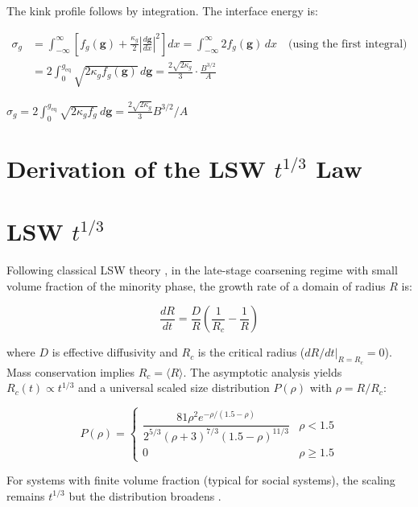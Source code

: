 \documentclass[12pt,a4paper]{article}
\theoremstyle{plain}
\theoremstyle{definition}
\newcommand{\gf}{\mathbf{g}}          %
\newcommand{\cn}[1]{\textcolor{scxgray}{\textit{#1}}}
\begin{document}
The kink profile follows by integration. The interface energy is:

\begin{align}
    \sigma_g &= \int_{-\infty}^{\infty} \left[f_g(\gf) +
        \frac{\kappa_g}{2}\left|\frac{d\gf}{dx}\right|^2\right] dx
    = \int_{-\infty}^{\infty} 2f_g(\gf)\,dx
    \quad\text{(using the first integral)} \\
    &= 2\int_0^{g_{\text{eq}}} \sqrt{2\kappa_g f_g(\gf)}\,d\gf
    = \frac{2\sqrt{2\kappa_g}}{3}\cdot\frac{B^{3/2}}{A}
\end{align}

\bigskip
\noindent
\cn{$\sigma_g = 2\int_0^{g_{\text{eq}}}\sqrt{2\kappa_g f_g}\,d\gf = \frac{2\sqrt{2\kappa_g}}{3}B^{3/2}/A$}

\section{Derivation of the LSW $t^{1/3}$ Law}
\section*{LSW $t^{1/3}$ }

Following classical LSW theory \cite{lifshitz1961, wagner1961}, in the
late-stage coarsening regime with small volume fraction of the minority
phase, the growth rate of a domain of radius $R$ is:

\begin{equation}
    \frac{dR}{dt} = \frac{D}{R}\left(\frac{1}{R_c} - \frac{1}{R}\right)
    \label{eq:lsw_growth_app}
\end{equation}

where $D$ is effective diffusivity and $R_c$ is the critical radius
($dR/dt|_{R=R_c}=0$). Mass conservation implies $R_c = \langle R\rangle$.
The asymptotic analysis \cite{lifshitz1961} yields $R_c(t) \propto t^{1/3}$
and a universal scaled size distribution $P(\rho)$ with $\rho = R/R_c$:

\begin{equation}
    P(\rho) = \begin{cases}
        \dfrac{81\rho^2 e^{-\rho/(1.5-\rho)}}{2^{5/3}(\rho+3)^{7/3}(1.5-\rho)^{11/3}} & \rho < 1.5 \\
        0 & \rho \ge 1.5
    \end{cases}
\end{equation}

For systems with finite volume fraction (typical for social systems), the
scaling remains $t^{1/3}$ but the distribution broadens \cite{ardell1972}.
\end{document}
